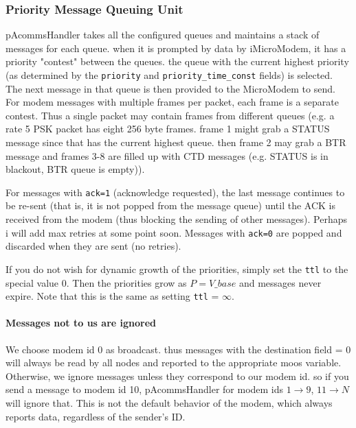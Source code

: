\documentclass[11pt, letterpaper, oneside]{memoir}
\begin{document}
%
%

\subsubsection{Priority Message Queuing Unit}

pAcommsHandler takes all the configured queues and maintains a stack of messages for each
  queue. when it is prompted by data by iMicroModem, it has a priority
  "contest" between the queues. the queue with the current highest
  priority (as determined by the \verb|priority| and
  \verb|priority_time_const| fields) is selected. The next message in
  that queue is then provided to the MicroModem to send. For modem
  messages with multiple frames per packet, each frame is a separate
  contest. Thus a single packet may contain frames from different
  queues (e.g. a rate 5 PSK packet has eight 256 byte frames. frame 1
  might grab a STATUS message since that has the current highest
  queue. then frame 2 may grab a BTR message and frames 3-8 are filled
  up with CTD messages (e.g. STATUS is in blackout, BTR queue is
  empty)).

For messages with \verb|ack=1| (acknowledge requested), the last
  message continues to be re-sent (that is, it is not popped from the
  message queue) until the ACK is received from the modem (thus
  blocking the sending of other messages). Perhaps i will add max
  retries at some point soon. Messages with \verb|ack=0| are popped
  and discarded when they are sent (no retries).

If you do not wish for dynamic growth of the priorities, simply
  set the \verb|ttl| to the special value 0. Then the priorities grow as $P = V\_{base}$ and messages never expire. Note that this is the same as setting \verb|ttl| = $\infty$.

\paragraph{Messages not to us are ignored} We choose modem id 0 as broadcast. thus messages with the destination
  field = 0 will always be read by all nodes and reported to the
  appropriate moos variable. Otherwise, we ignore messages unless they
  correspond to our modem id. so if you send a message to modem id 10,
  pAcommsHandler for modem ids $1 \rightarrow 9$, $11\rightarrow N$
  will ignore that. This is not the default behavior of the modem,
  which always reports data, regardless of the sender's ID.
  
\end{document}
